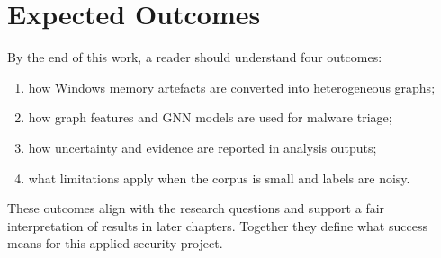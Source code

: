 \section{Expected Outcomes}

By the end of this work, a reader should understand four outcomes:

\begin{enumerate}
\item how Windows memory artefacts are converted into heterogeneous graphs;
\item how graph features and GNN models are used for malware triage;
\item how uncertainty and evidence are reported in analysis outputs;
\item what limitations apply when the corpus is small and labels are noisy.
\end{enumerate}

These outcomes align with the research questions and support a fair interpretation of results in later chapters. Together they define what success means for this applied security project.
